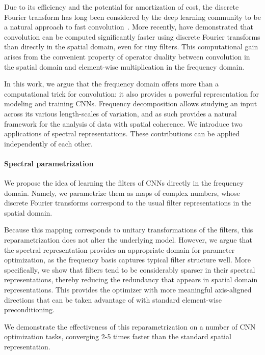 \documentclass{article} %
\begin{document}
Due to its efficiency and the potential for amortization of cost, the discrete Fourier transform has long been considered by the deep learning community to be a natural approach to fast convolution~\citep{Bengio+chapter2007}. More recently, \citet{DBLP:journals/corr/MathieuHL13,DBLP:journals/corr/VasilacheJMCPL14} have demonstrated that convolution can be computed significantly faster using discrete Fourier transforms than directly in the spatial domain, even for tiny filters. This computational gain arises from the convenient property of operator duality between convolution in the spatial domain and element-wise multiplication in the frequency domain.

In this work, we argue that the frequency domain offers more than a computational trick for convolution: it also provides a powerful representation for modeling and training CNNs.  Frequency decomposition allows studying an input across its various length-scales of variation, and as such provides a natural framework for the analysis of data with spatial coherence.  We introduce two applications of spectral representations. These contributions can be applied independently of each other. 

\paragraph{Spectral parametrization} We propose the idea of learning the filters of CNNs directly in the frequency domain. Namely, we parametrize them as maps of complex numbers, whose discrete Fourier transforms correspond to the usual filter representations in the spatial domain. 

Because this mapping corresponds to unitary transformations of the filters, this reparametrization does not alter the underlying model.  However, we argue that the spectral representation provides an appropriate domain for parameter optimization, as the frequency basis captures typical filter structure well. More specifically, we show that filters tend to be considerably sparser in their spectral representations, thereby reducing the redundancy that appears in spatial domain representations. This provides the optimizer with more meaningful axis-aligned directions that can be taken advantage of with standard element-wise preconditioning.

We demonstrate the effectiveness of this reparametrization on a number of CNN optimization tasks, converging 2-5 times faster than the standard spatial representation.
\end{document}
